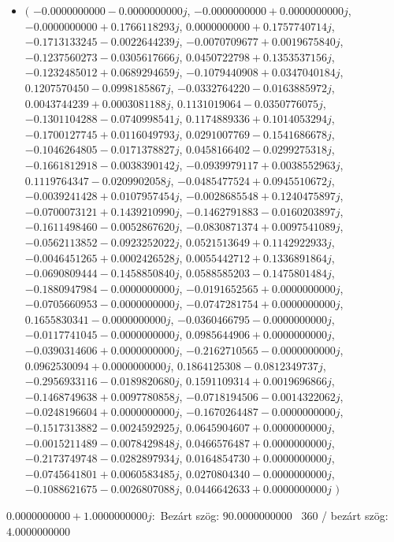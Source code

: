 \documentclass[14pt,a4paper]{article}
\begin{document}
\begin{itemize}
\item
$\big($
$-0.0000000000-0.0000000000j$, $-0.0000000000+0.0000000000j$, $-0.0000000000+0.1766118293j$, $0.0000000000+0.1757740714j$, $-0.1713133245-0.0022644239j$, $-0.0070709677+0.0019675840j$, $-0.1237560273-0.0305617666j$, $0.0450722798+0.1353537156j$, $-0.1232485012+0.0689294659j$, $-0.1079440908+0.0347040184j$, $0.1207570450-0.0998185867j$, $-0.0332764220-0.0163885972j$, $0.0043744239+0.0003081188j$, $0.1131019064-0.0350776075j$, $-0.1301104288-0.0740998541j$, $0.1174889336+0.1014053294j$, $-0.1700127745+0.0116049793j$, $0.0291007769-0.1541686678j$, $-0.1046264805-0.0171378827j$, $0.0458166402-0.0299275318j$, $-0.1661812918-0.0038390142j$, $-0.0939979117+0.0038552963j$, $0.1119764347-0.0209902058j$, $-0.0485477524+0.0945510672j$, $-0.0039241428+0.0107957454j$, $-0.0028685548+0.1240475897j$, $-0.0700073121+0.1439210990j$, $-0.1462791883-0.0160203897j$, $-0.1611498460-0.0052867620j$, $-0.0830871374+0.0097541089j$, $-0.0562113852-0.0923252022j$, $0.0521513649+0.1142922933j$, $-0.0046451265+0.0002426528j$, $0.0055442712+0.1336891864j$, $-0.0690809444-0.1458850840j$, $0.0588585203-0.1475801484j$, $-0.1880947984-0.0000000000j$, $-0.0191652565+0.0000000000j$, $-0.0705660953-0.0000000000j$, $-0.0747281754+0.0000000000j$, $0.1655830341-0.0000000000j$, $-0.0360466795-0.0000000000j$, $-0.0117741045-0.0000000000j$, $0.0985644906+0.0000000000j$, $-0.0390314606+0.0000000000j$, $-0.2162710565-0.0000000000j$, $0.0962530094+0.0000000000j$, $0.1864125308-0.0812349737j$, $-0.2956933116-0.0189820680j$, $0.1591109314+0.0019696866j$, $-0.1468749638+0.0097780858j$, $-0.0718194506-0.0014322062j$, $-0.0248196604+0.0000000000j$, $-0.1670264487-0.0000000000j$, $-0.1517313882-0.0024592925j$, $0.0645904607+0.0000000000j$, $-0.0015211489-0.0078429848j$, $0.0466576487+0.0000000000j$, $-0.2173749748-0.0282897934j$, $0.0164854730+0.0000000000j$, $-0.0745641801+0.0060583485j$, $0.0270804340-0.0000000000j$, $-0.1088621675-0.0026807088j$, $0.0446642633+0.0000000000j$
$\big)$
\end{itemize}
$0.0000000000+1.0000000000j$:\
Bezárt szög: $90.0000000000$ \
360 / bezárt szög: $4.0000000000$\
\end{document}
